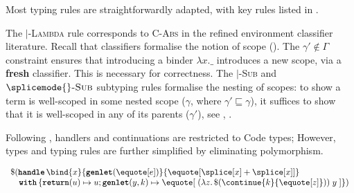 Most typing rules are straightforwardly adapted, with key rules listed in . 

The \compilemode{}$\mid$\quotemode{}-\textsc{Lambda} rule corresponds to \textsc{C-Abs} in the refined environment classifier literature. Recall that classifiers formalise the notion of scope (). The $\gamma' \notin \Gamma$ constraint ensures that introducing a binder $\lambda x.\_$ introduces a new scope, via a \textbf{fresh} classifier. This is necessary for correctness. The \compilemode{}$\mid$\quotemode{}\textsc{-Sub} and $\splicemode{}\textsc{-Sub}$ subtyping rules formalise the nesting of scopes: to show a term is well-scoped in some nested scope ($\gamma$, where $\gamma' \sqsubseteq \gamma$), it suffices to show that it is well-scoped in any of its parents ($\gamma'$), see , .

Following \citeauthor{isoda-24}, handlers and continuations are restricted to \textsf{Code} types; However, types and typing rules are further simplified by eliminating polymorphism. 

\begin{code} 
 \begin{source}
  $\begin{array}{l}
      \$(\textbf{\texttt{handle}} \, {\bind{x}{\textbf{\texttt{genlet}}(\equote[e])}{\equote[{\splice[x]} + {\splice[x]}]}} \\
      \quad \textbf{\texttt{with}} \, \{ \textbf{\texttt{return}}(u) \mapsto {u}; \textbf{\texttt{genlet}}(y, k) \mapsto {\equote[\; (\lambda z. \, \$(\continue{k}{\equote[z]})) \; y \;]}\})
    \end{array}$
 \end{source}
 \label{listing:refined-environment-classifiers-let-insertion}
\end{code}

